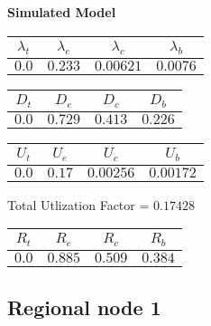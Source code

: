 \documentclass{article}
\begin{document}
\begin{minipage}{0.5\textwidth}
\centering	\textbf{Simulated Model}
\begin{table}[H]
\centering
\begin{tabular}{@{}cccc@{}}
\toprule
$\lambda_t$ & $\lambda_e$ & $\lambda_c$ & $\lambda_b$\\
\midrule
$0.0$ & $0.233$ & $0.00621$ & $0.0076$\\
\bottomrule
\end{tabular}
\end{table}
\begin{table}[H]
\centering
\begin{tabular}{@{}cccc@{}}
\toprule
$D_t$ & $D_e$ & $D_c$ & $D_b$\\
\midrule
$0.0$ & $0.729$ & $0.413$ & $0.226$\\
\bottomrule
\end{tabular}
\end{table}\begin{table}[H]
\centering
\begin{tabular}{@{}cccc@{}}
\toprule
$U_t$ & $U_e$ & $U_c$ & $U_b$\\
\midrule
$0.0$ & $0.17$ & $0.00256$ & $0.00172$\\
\bottomrule
\end{tabular}
\end{table}
\centering Total Utlization Factor = $0.17428$
\begin{table}[H]
\centering
\begin{tabular}{@{}cccc@{}}
\toprule
$R_t$ & $R_e$ & $R_c$ & $R_b$\\
\midrule
$0.0$ & $0.885$ & $0.509$ & $0.384$\\
\bottomrule
\end{tabular}
\end{table}
\end{minipage}\subsection{Regional node 1}
\end{document}
